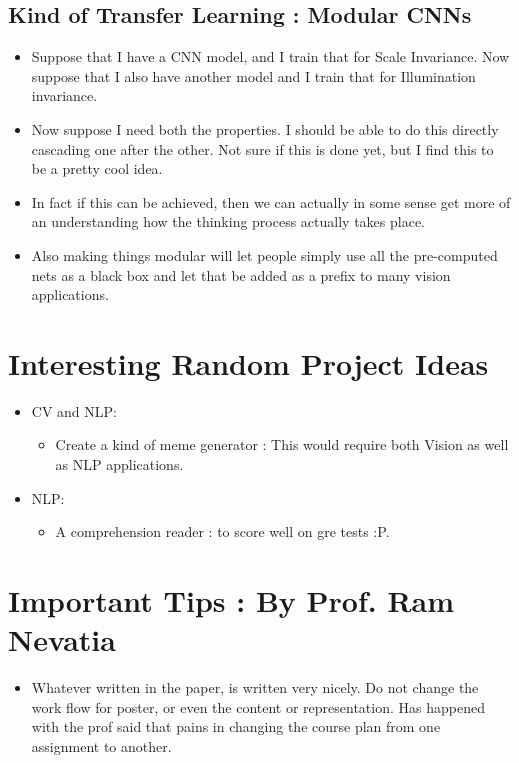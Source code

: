 \documentclass{article}
\begin{document}
\subsection{Kind of Transfer Learning : Modular CNNs}
\begin{itemize}
\item Suppose that I have a CNN model, and I train that for Scale Invariance. Now suppose that I also have another model and I train that for Illumination invariance.
\item Now suppose I need both the properties. I should be able to do this directly cascading one after the other. Not sure if this is done yet, but I find this to be a pretty cool idea.
\item In fact if this can be achieved, then we can actually in some sense get more of an understanding how the thinking process actually takes place.
\item Also making things modular will let people simply use all the pre-computed nets as a black box and let that be added as a prefix to many vision applications.
\end{itemize}

\section{Interesting Random Project Ideas}
\begin{itemize}
\item CV and NLP:
  \begin{itemize}
  \item Create a kind of meme generator : This would require both Vision as well as NLP applications.
  \end{itemize}
\item NLP:
  \begin{itemize}
  \item A comprehension reader : to score well on gre tests :P.
  \end{itemize}
\end{itemize}

\section{Important Tips : By Prof. Ram Nevatia}
\begin{itemize}
\item Whatever written in the paper, is written very nicely. Do not change the work flow for poster, or even the content or representation. Has happened with the prof said that pains in changing the course plan from one assignment to another.
\end{itemize}
\end{document}
